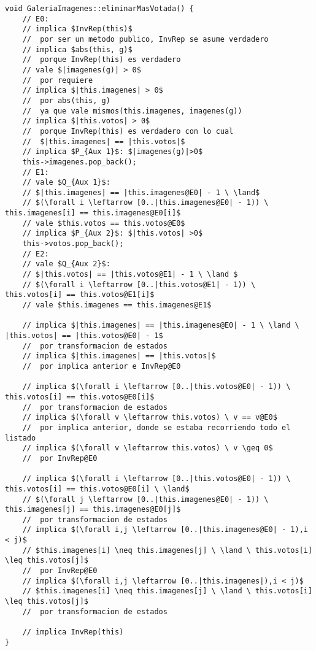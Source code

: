 \documentclass[10pt,a4paper,spanish]{article}
\begin{document}
\begin{lstlisting}
void GaleriaImagenes::eliminarMasVotada() {
	// E0:
	// implica $InvRep(this)$
	// 	por ser un metodo publico, InvRep se asume verdadero
	// implica $abs(this, g)$
	// 	porque InvRep(this) es verdadero
	// vale $|imagenes(g)| > 0$
	// 	por requiere
	// implica $|this.imagenes| > 0$
	// 	por abs(this, g)
	//	ya que vale mismos(this.imagenes, imagenes(g))
	// implica $|this.votos| > 0$
	// 	porque InvRep(this) es verdadero con lo cual
	//	$|this.imagenes| == |this.votos|$
	// implica $P_{Aux 1}$: $|imagenes(g)|>0$
	this->imagenes.pop_back();
	// E1:
	// vale $Q_{Aux 1}$:
	// $|this.imagenes| == |this.imagenes@E0| - 1 \ \land$
	// $(\forall i \leftarrow [0..|this.imagenes@E0| - 1)) \ this.imagenes[i] == this.imagenes@E0[i]$
	// vale $this.votos == this.votos@E0$
	// implica $P_{Aux 2}$: $|this.votos| >0$
	this->votos.pop_back();
	// E2:
	// vale $Q_{Aux 2}$:
	// $|this.votos| == |this.votos@E1| - 1 \ \land $
	// $(\forall i \leftarrow [0..|this.votos@E1| - 1)) \ this.votos[i] == this.votos@E1[i]$
	// vale $this.imagenes == this.imagenes@E1$

	// implica $|this.imagenes| == |this.imagenes@E0| - 1 \ \land \ |this.votos| == |this.votos@E0| - 1$
	// 	por transformacion de estados
	// implica $|this.imagenes| == |this.votos|$
	//	por implica anterior e InvRep@E0

	// implica $(\forall i \leftarrow [0..|this.votos@E0| - 1)) \ this.votos[i] == this.votos@E0[i]$
	//	por transformacion de estados
	// implica $(\forall v \leftarrow this.votos) \ v == v@E0$
	//	por implica anterior, donde se estaba recorriendo todo el listado
	// implica $(\forall v \leftarrow this.votos) \ v \geq 0$
	//	por InvRep@E0

	// implica $(\forall i \leftarrow [0..|this.votos@E0| - 1)) \ this.votos[i] == this.votos@E0[i] \ \land$
	// $(\forall j \leftarrow [0..|this.imagenes@E0| - 1)) \ this.imagenes[j] == this.imagenes@E0[j]$
	// 	por transformacion de estados
	// implica $(\forall i,j \leftarrow [0..|this.imagenes@E0| - 1),i < j)$
	// $this.imagenes[i] \neq this.imagenes[j] \ \land \ this.votos[i] \leq this.votos[j]$
	//	por InvRep@E0
	// implica $(\forall i,j \leftarrow [0..|this.imagenes|),i < j)$
	// $this.imagenes[i] \neq this.imagenes[j] \ \land \ this.votos[i] \leq this.votos[j]$
	//	por transformacion de estados

	// implica InvRep(this)
}

\end{lstlisting}
\end{document}
